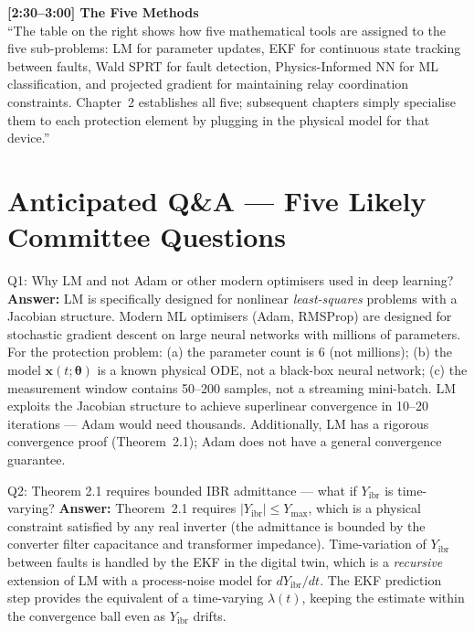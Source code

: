 \documentclass[12pt,a4paper]{article}
\begin{document}
\begin{speakbox}
\medskip
\textbf{[2:30--3:00] The Five Methods}\\
``The table on the right shows how five mathematical tools are assigned to the five
sub-problems: LM for parameter updates, EKF for continuous state tracking between
faults, Wald SPRT for fault detection, Physics-Informed NN for ML classification,
and projected gradient for maintaining relay coordination constraints.  Chapter~2
establishes all five; subsequent chapters simply specialise them to each protection
element by plugging in the physical model for that device.''
\end{speakbox}

\section{Anticipated Q\&A --- Five Likely Committee Questions}

\begin{keybox}{Q1: Why LM and not Adam or other modern optimisers used in deep learning?}
\textbf{Answer:}  LM is specifically designed for nonlinear \emph{least-squares}
problems with a Jacobian structure.  Modern ML optimisers (Adam, RMSProp) are
designed for stochastic gradient descent on large neural networks with millions of
parameters.  For the protection problem: (a) the parameter count is 6 (not millions);
(b) the model $\mathbf{x}(t;\bm{\theta})$ is a known physical ODE, not a black-box
neural network; (c) the measurement window contains 50--200 samples, not a streaming
mini-batch.  LM exploits the Jacobian structure to achieve superlinear convergence in
10--20 iterations --- Adam would need thousands.  Additionally, LM has a rigorous
convergence proof (Theorem~2.1); Adam does not have a general convergence guarantee.
\end{keybox}

\begin{keybox}{Q2: Theorem 2.1 requires bounded IBR admittance --- what if $Y_\mathrm{ibr}$ is time-varying?}
\textbf{Answer:}  Theorem~2.1 requires $|Y_\mathrm{ibr}| \leq Y_\mathrm{max}$, which is
a physical constraint satisfied by any real inverter (the admittance is bounded by the
converter filter capacitance and transformer impedance).  Time-variation of $Y_\mathrm{ibr}$
between faults is handled by the EKF in the digital twin, which is a \emph{recursive}
extension of LM with a process-noise model for $dY_\mathrm{ibr}/dt$.  The EKF prediction
step provides the equivalent of a time-varying $\lambda(t)$, keeping the estimate
within the convergence ball even as $Y_\mathrm{ibr}$ drifts.
\end{keybox}
\end{document}
